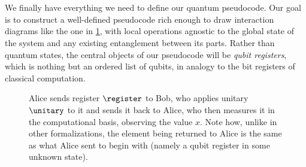 \section{\titlePseudocode}\label{sec:pseudocode}

  We finally have everything we need to define our quantum pseudocode. 
    Our goal is to construct a well-defined pseudocode rich enough 
    to draw interaction diagrams like the one in \cref{fig:aliceandbob},
    with local operations agnostic to the global state of the
    system and any existing entanglement between its parts.
    Rather than quantum states, the central objects of our pseudocode will be
    \emph{qubit registers}, which is nothing but an ordered list of qubits,
    in analogy to the bit registers of classical computation.

  \begin{figure}[t]
    \centering
    \def\arrowlength{3cm}
    \fbox{
      \pseudocode{
        \underline{\text{Alice}}\
              \<\< \underline{\text{Bob}} \\
        \register \gets (\qubit_1, \ldots \qubit_n) 
          \<\sendmessageright*[\arrowlength]{\register} \\
          \<\< \unitary(\register) \\
          \< \sendmessageleft*[\arrowlength]{\register} \\
        x \obstore \register
      }
    }
    \caption{
      \label{fig:aliceandbob} %
      Alice sends register $\register$ to Bob, who applies unitary
      $\unitary$ to it and sends it back to Alice,
      who then measures it in the computational basis, observing the value $x$.
      Note how, unlike in other formalizations, the element being returned to
      Alice is the same as what Alice sent to begin with (namely a qubit
      register in some unknown state).
    }
  \end{figure}

